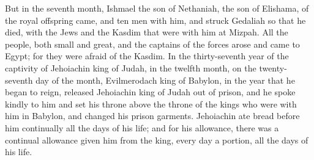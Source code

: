 \myverse{}But in the seventh month, Ishmael the son of Nethaniah, the
son of Elishama, of the royal offspring came, and ten men with him, and struck Gedaliah so that he died,
with the Jews and the Kasdim that were with him at Mizpah.
\myverse{}All the people, both small and great, and the captains of the forces arose
and came to Egypt; for they were afraid of the Kasdim.
\myverse{}In the thirty-seventh year of the captivity of Jehoiachin king of Judah,
in the twelfth month, on the twenty-seventh day of the month, Evilmerodach king of Babylon, in the year
that he began to reign, released Jehoiachin king of Judah out of prison,
\myverse{}and he spoke kindly to him and set his throne above the throne of the kings
who were with him in Babylon,
\myverse{}and changed his prison garments. Jehoiachin ate bread before him continually
all the days of his life;
\myverse{}and for his allowance, there was a continual allowance given him from the
king, every day a portion, all the days of his life.


